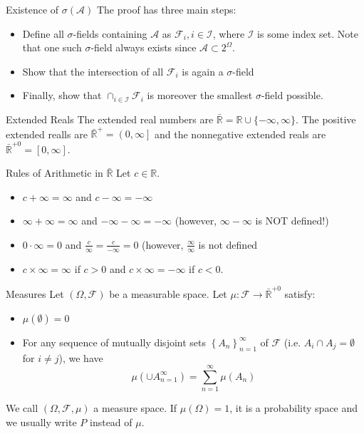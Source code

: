 \documentclass[avery5371,grid]{flashcards}
\begin{document}
\begin{flashcard}[Theorem]{Existence of $\sigma\left( \mathcal{A} \right)$}
The proof has three main steps:
\begin{itemize}
 \item Define all $\sigma$-fields containing $\mathcal{A}$ as $\mathcal{F}_i, i \in \mathcal{I}$,
 where $\mathcal{I}$ is some index set. Note that one such $\sigma$-field always exists since 
 $\mathcal{A} \subset 2^\Omega$.
 \item Show that the intersection of all $\mathcal{F}_i$ is again 
 a $\sigma$-field 
 \item Finally, show that $\cap_{i \in \mathcal{I}} \mathcal{F}_i$ is moreover the smallest 
 $\sigma$-field possible.
\end{itemize}

\end{flashcard}

\begin{flashcard}[Definition]{Extended Reals}
 The extended real numbers are $\bar{\mathbb{R}} = \mathbb{R} \cup \{-\infty,\infty \}$. The positive extended realls
 are $\bar{\mathbb{R}}^+ = \left( 0,\infty  \right]$ and the nonnegative
 extended reals are $\bar{\mathbb{R}}^{+0} = \left[ 0,\infty  \right]$.
\end{flashcard}

\begin{flashcard}[Definition]{Rules of Arithmetic in $\bar{\mathbb{R}}$}
Let $c \in \mathbb{R}$.
\begin{itemize}
 \item $c + \infty = \infty$ and $c - \infty = -\infty$
 \item $\infty + \infty = \infty$ and $-\infty - \infty = - \infty$ (however,
 $\infty - \infty$ is NOT defined!)
 \item $0 \cdot \infty = 0$ and $\frac{c}{\infty} = \frac{c}{-\infty} = 0$ (however, $\frac{\infty}{\infty}$
 is not defined
 \item $c \times \infty = \infty$ if $c > 0 $ and $c \times \infty = - \infty$ if $c < 0$. 
\end{itemize}
 
\end{flashcard}

\begin{flashcard}[Definition]{Measures}
\scriptsize
 Let $\left( \Omega,\mathcal{F} \right)$ be a measurable space. Let $\mu : \mathcal{F} \to \bar{\mathbb{R}}^{+0}$
 satisfy:
 \begin{itemize}
  \item $\mu\left( \emptyset \right) = 0$
  \item For any sequence of mutually disjoint sets $\left\{ A_n \right\}_{n=1}^\infty$ of $\mathcal{F}$ (i.e. $A_i \cap A_j = \emptyset$ for
  $i \ne j$), we have
  \[
  \mu\left( \cup A_{n=1}^\infty  \right) = \sum_{n=1}^\infty \mu\left( A_n \right)
  \]
 \end{itemize}
We call $\left( \Omega, \mathcal{F}, \mathcal{\mu} \right)$ a measure space. If $\mu\left( \Omega \right) = 1$,
it is a probability space and we usually write $P$ instead of $\mu$.
\end{flashcard}
\end{document}
